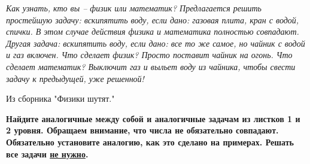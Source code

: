 \textit{Как узнать, кто вы -- физик или математик? Предлагается решить простейшую задачу: вскипятить воду, если дано: газовая плита, кран с водой, спички. В этом случае действия физика и математика полностью совпадают. Другая задача: вскипятить воду, если дано: все то же самое, но чайник с водой и газ включен. Что сделает физик? Просто поставит чайник на огонь. Что сделает математик? Выключит газ и выльет воду из чайника, чтобы свести задачу к предыдущей, уже решенной!}	
\begin{flushright}
	Из сборника "Физики шутят."
\end{flushright}
\textbf{Найдите аналогичные между собой и аналогичные задачам из листков 1 и 2 уровня. Обращаем внимание, что числа не обязательно совпадают. Обязательно установите аналогию, как это сделано на примерах. Решать все задачи \underline{не нужно}.}
